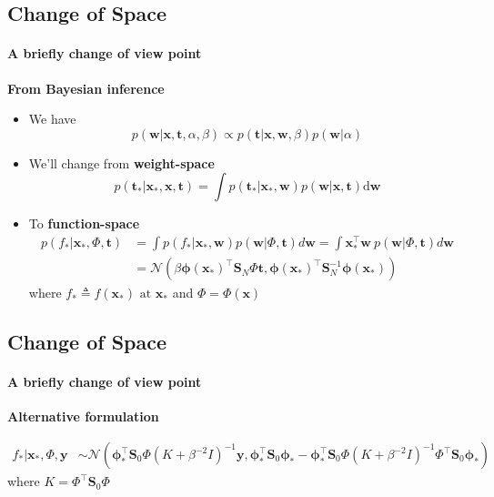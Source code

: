 \subsection{Change of Space}
\begin{frame}{\insertsubsection}
    \framesubtitle{A briefly change of view point} 

    \textcolor{UniGold}{\textbf{From Bayesian inference}}
    \begin{itemize}
        \item We have $$p(\mathbf{w} | \mathbf{x}, \mathbf{t}, \alpha, \beta) \propto p(\mathbf{t} | \mathbf{x}, \mathbf{w}, \beta) p(\mathbf{w} | \alpha)$$
        \item We'll change from \textcolor{UniOrange}{\textbf{weight-space}} $$p(\mathbf{t}_{*} | \mathbf{x}_{*}, \mathbf{x}, \mathbf{t})=\displaystyle\int p(\mathbf{t}_{*} | \mathbf{x}_{*}, \mathbf{w}) p(\mathbf{w} | \mathbf{x}, \mathbf{t}) \mathrm{d} \mathbf{w}$$
        \item To \textcolor{UniOrange}{\textbf{function-space}}
    \begin{equation*}
       \begin{aligned} p\left(f_{*} | \mathbf{x}_{*}, \Phi, \mathbf{t}\right) &=\int p\left(f_{*} | \mathbf{x}_{*}, \mathbf{w}\right) p(\mathbf{w} | \Phi, \mathbf{t}) d \mathbf{w}=\int \mathbf{x}_{*}^{\top} \mathbf{w} \ p(\mathbf{w} | \Phi, \mathbf{t}) d \mathbf{w} \\ &=\mathcal{N}\left(\beta \boldsymbol{\phi}(\mathbf{x}_{*})^{\top} \mathbf{S}_N \Phi \mathbf{t}, \boldsymbol{\phi}(\mathbf{x}_{*})^{\top} \mathbf{S}_N^{-1} \boldsymbol{\phi}(\mathbf{x}_{*})\right) \end{aligned} 
    \end{equation*}
    where $f_{*} \triangleq f\left(\mathbf{x}_{*}\right) \text { at } \mathbf{x}_{*}$ and $\Phi = \Phi(\mathbf{x})$
    \end{itemize}
\end{frame}

\subsection{Change of Space}
\begin{frame}{\insertsubsection}
    \framesubtitle{A briefly change of view point} 

    \textcolor{UniGold}{\textbf{Alternative formulation}}
    
    \begin{equation*}
        \begin{aligned} f_{*} | \mathbf{x}_{*}, \Phi, \mathbf{y} & \sim \mathcal{N}\left(\boldsymbol{\phi}_{*}^{\top} \mathbf{S}_0 \Phi\left(K+\beta^{-2} I\right)^{-1} \mathbf{y}, \boldsymbol{\phi}_{*}^{\top} \mathbf{S}_0 \boldsymbol{\phi}_{*}-\boldsymbol{\phi}_{*}^{\top} \mathbf{S}_0 \Phi\left(K+\beta^{-2} I\right)^{-1} \Phi^{\top} \mathbf{S}_0 \boldsymbol{\phi}_{*}\right)
        \end{aligned}
    \end{equation*}
    where $K = \Phi^{\top}\mathbf{S}_0\Phi$
    
\end{frame}

